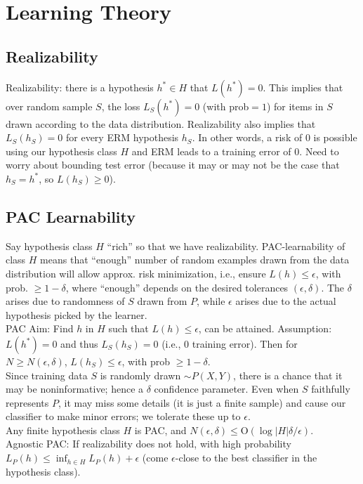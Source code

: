 \section{Learning Theory}

\subsection*{Realizability}

Realizability: there is a hypothesis $h^* \in H$ that $L(h^*) = 0$. This implies that over random sample $S$, the loss $L_S(h^*)=0$
(with prob$=1$) for items in $S$ drawn according to the data distribution. Realizability also implies that $L_S(h_S)=0$ for every ERM hypothesis $h_S$. In other words, a risk of $0$ is possible using our hypothesis class $H$ and ERM leads to a training error of $0$. Need to worry about bounding test error (because it may or may not be the case that $h_S=h^*$, so $L(h_S) \geq 0$).

\subsection*{PAC Learnability}
Say hypothesis class $H$ “rich” so that we have realizability. PAC-learnability of class $H$ means that “enough” number of random examples drawn from the data distribution will allow approx. risk minimization, i.e., ensure $L(h) \leq \epsilon$, with prob. $\geq 1-\delta$, where “enough” depends on the desired tolerances $(\epsilon, \delta)$. The $\delta$ arises due to randomness of $S$ drawn from $P$, while $\epsilon$ arises due to the actual hypothesis picked by the learner.\\
PAC Aim: Find $h$ in $H$ such that $L(h) \leq \epsilon$, can be attained. Assumption: $L(h^*)=0$ and thus $L_S(h_S)=0$ (i.e., 0 training error). Then for $N \geq N(\epsilon, \delta)$, $L(h_S) \leq \epsilon$, with prob $\geq 1-\delta$.\\
Since training data $S$ is randomly drawn $\sim P(X,Y)$, there is a chance that it may be noninformative; hence a $\delta$ confidence parameter. Even when $S$ faithfully represents $P$, it may miss some details (it is just a finite sample) and cause our classifier to make minor errors; we tolerate these up to $\epsilon$.\\
Any finite hypothesis class $H$ is PAC, and $N(\epsilon, \delta) \leq \text{O}(\log|H|\delta/\epsilon)$.\\
Agnostic PAC: If realizability does not hold, with high probability $L_{P}(h) \leq \inf_{h \in H} L_{P}(h) + \epsilon$ (come $\epsilon$-close to the best classifier in the hypothesis class).

